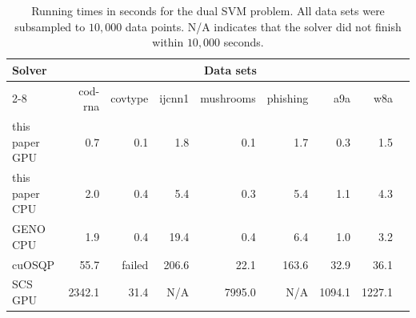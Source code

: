 \begin{table}[h!]
\small
  \begin{center}
  \label{tab:SVM}
  \begin{tabular}{l*{8}{r}}
    \toprule
    \multirow{2}{*}{Solver} & \multicolumn{7}{c}{Data sets} \\
    \cmidrule{2-8}
    & cod-rna & covtype & ijcnn1 & mushrooms & phishing & a9a & w8a \\
    \midrule
    this paper GPU & 0.7 & 0.1 & 1.8 & 0.1 & 1.7 & 0.3 & 1.5 \\
    this paper CPU & 2.0 & 0.4 & 5.4 & 0.3 & 5.4 & 1.1 & 4.3 \\
    GENO CPU & 1.9 & 0.4 & 19.4 & 0.4 & 6.4 & 1.0 & 3.2 \\
    cuOSQP & 55.7 & failed & 206.6 & 22.1 & 163.6 & 32.9 & 36.1 \\
    SCS GPU & 2342.1 & 31.4 & N/A & 7995.0 & N/A & 1094.1 & 1227.1 \\
    \bottomrule
  \end{tabular}
  \caption{Running times in seconds for the dual SVM problem. All data sets were subsampled to $10,000$ data points. N/A indicates that the solver did not finish within $10,000$ seconds.}
  \end{center}
\end{table}